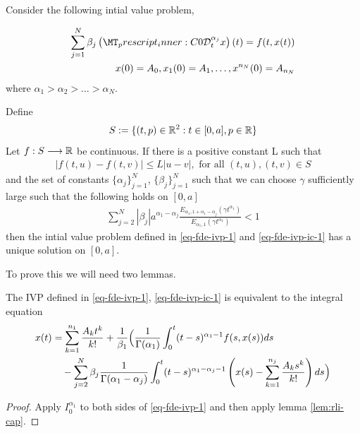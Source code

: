 \begin{mdframed}[innertopmargin=10pt]
\begin{theorem}[Uniqueness]
\label{thm-existence-uniq}
Consider the following intial value problem,

	\begin{align}
		\label{eq-fde-ivp-1}
		\sum_{j=1}^{N} \beta_j\capder{0}{t}{\alpha_j}{x}(t) = f(t,x(t)) \\
		\label{eq-fde-ivp-ic-1}
		x(0) = A_0, x_1(0) = A_1, \ldots, x^{n_N}(0) = A_{n_N}
	\end{align}
	where $ \alpha_1 > \alpha_2 > \ldots > \alpha_N $.
	
	Define
		\begin{align}
		 S:= \{ (t,p) \in \mathbb{R}^2 : t \in [0, a], p \in \mathbb{R} \} 
		\end{align}
	Let $ f : S \longrightarrow \mathbb{R} $ be continuous. If there is a positive constant L such that 
		\begin{align}
		\label{eq:uniq-lipshitz}
		|f(t,u) - f(t,v)| \leq L|u-v|, \text{ for all } (t,u), (t,v) \in S
		\end{align}
and the set of constants $ \{ \alpha_j \}_{j = 1}^{N} $, $ \{ \beta_j \}_{j=1}^N $
such that we can choose $ \gamma $ sufficiently large such that the following holds on $ [0, a] $
	\begin{align}
	    \label{eq:fde-uniq-cond}
\sum_{j=2}^N |\beta_j| a^{\alpha_1 - \alpha_j} \frac{E_{\alpha_1,1+\alpha_1-\alpha_j}(\gamma t^{\alpha_1})}{E_{\alpha_1,1}(\gamma t^{\alpha_1})} < 1
	\end{align}
	then the intial value problem defined in \ref{eq-fde-ivp-1} and \ref{eq-fde-ivp-ic-1} has a unique solution on $ [0, a] $.
\end{theorem}
\end{mdframed}
To prove this we will need two lemmas. 
\begin{mdframed}[innertopmargin=10pt]
\begin{lemma}
	The IVP defined in \eqref{eq-fde-ivp-1}, \eqref{eq-fde-ivp-ic-1} is equivalent to the integral equation
	\begin{align}
		x(t) &= \sum_{k=1}^{n_1}\frac{A_kt^k}{k!} + \frac{1}{\beta_1} \Bigl( \frac{1}{\Gamma(\alpha_1)}\int_{0}^{t} (t-s)^{\alpha_1 - 1}f(s,x(s))ds \\
			& \ \ \ - \sum_{j=2}^{N}\beta_j \frac{1}{\Gamma(\alpha_1 - \alpha_j)}
			\int_{0}^{t}(t-s)^{\alpha_1 - \alpha_j - 1}\left(x(s) - \sum_{k=1}^{n_j}\frac{A_ks^k}{k!} \right) ds \Bigr)
	\end{align}
\end{lemma}
\end{mdframed}
\begin{proof}
	Apply $ I_0^{\alpha_1} $ to both sides of \eqref{eq-fde-ivp-1} and then apply lemma \ref{lem:rli-cap}.
\end{proof}

